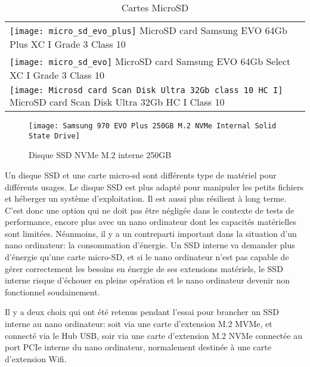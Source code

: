 {
    \renewcommand*{\arraystretch}{1.4}
    \begin{table}[ht]
    \centering
    \caption{Cartes MicroSD}\label{table:cartes_microsd}
    \vspace{0.3em} %
    \begin{tabular}{l}
        \texttt{[image: micro\_sd\_evo\_plus]} MicroSD card Samsung EVO 64Gb Plus XC I Grade 3 Class 10\\
        \texttt{[image: micro\_sd\_evo]} MicroSD card Samsung EVO 64Gb Select XC I Grade 3 Class 10\\
        \texttt{[image: Microsd card Scan Disk Ultra 32Gb class 10 HC I]} MicroSD card Scan Disk Ultra 32Gb HC I Class 10\\
    \end{tabular}
    \end{table}
}
{\color{red}}
\begin{figure}[H]
    \centering
    \texttt{[image: Samsung 970 EVO Plus 250GB M.2 NVMe Internal Solid State Drive]}
    \caption{Disque SSD NVMe M.2 interne 250GB}
    \label{fig:disquessd}
\end{figure}
\par Un disque SSD et une carte micro-sd sont différents type de matériel pour différents usages. Le disque SSD est plus adapté pour manipuler les petits fichiers et héberger un système d'exploitation. Il est aussi plus résilient à long terme. C'est donc une option qui ne doit pas être négligée dans le contexte de tests de performance, encore plus avec un nano ordinateur dont les capacités matérielles sont limitées. Néanmoins, il y a un contreparti important dans la situation d'un nano ordinateur: la consommation d'énergie. Un SSD interne va demander plus d'énergie qu'une carte micro-SD, et si le nano ordinateur n'est pas capable de gérer correctement les besoins en énergie de ses extensions matériels, le SSD interne risque d'échouer en pleine opération et le nano ordinateur devenir non fonctionnel soudainement.
\par Il y a deux choix qui ont été retenus pendant l'essai pour brancher un SSD interne au nano ordinateur: soit via une carte d'extension M.2 MVMe, et connecté via le Hub USB, soir via une carte d'extension M.2 NVMe connectée au port PCIe interne du nano ordinateur, normalement destinée à une carte d'extension Wifi.
